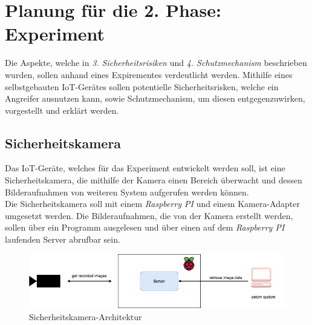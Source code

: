 \section{Planung für die 2. Phase: Experiment}
Die Aspekte, welche in \textit{3. Sicherheitsrisiken} und \textit{4. Schutzmechanism} beschrieben wurden, sollen anhand
eines Expirementes verdeutlicht werden. Mithilfe eines selbstgebauten IoT-Gerätes sollen potentielle Sicherheitsrisken, 
welche ein Angreifer ausnutzen kann, sowie Schutzmechanism, um diesen entgegenzuwirken, vorgestellt und erklärt werden.

\subsection{Sicherheitskamera}
Das IoT-Geräte, welches für das Experiment entwickelt werden soll, ist eine Sicherheitskamera, die mithilfe der Kamera
einen Bereich überwacht und dessen Bilderaufnahmen von  weiteren System aufgerufen werden können. \\

Die Sicherheitskamera soll mit einem \textit{Raspberry PI} und einem Kamera-Adapter umgesetzt werden.
Die Bilderaufnahmen, die von der Kamera erstellt werden, sollen über ein Programm ausgelesen und über
einen auf dem \textit{Raspberry PI} laufenden Server abrufbar sein. \\

	\begin{figure}[h]
		\centering
		\includegraphics[width=145mm]{images/raspberrypi.png}
		\caption{Sicherheitskamera-Architektur}
		\label{fig:arch-raspberrypi}
	\end{figure}
